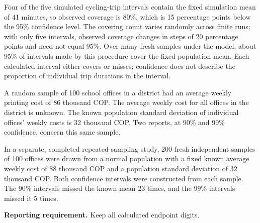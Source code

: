 Four of the five simulated cycling-trip intervals contain the fixed simulation mean of 41 minutes, so observed coverage is 80\%, which is 15 percentage points below the 95\% confidence level. The covering count varies randomly across finite runs; with only five intervals, observed coverage changes in steps of 20 percentage points and need not equal 95\%. Over many fresh samples under the model, about 95\% of intervals made by this procedure cover the fixed population mean. Each calculated interval either covers or misses; confidence does not describe the proportion of individual trip durations in the interval.

\vspace{-3mm}
\vspace{-4mm}
A random sample of 100 school offices in a district had an average weekly printing cost of 86 thousand COP. The average weekly cost for all offices in the district is unknown. The known population standard deviation of individual offices' weekly costs is 32 thousand COP. Two reports, at 90\% and 99\% confidence, concern this same sample.

In a separate, completed repeated-sampling study, 200 fresh independent samples of 100 offices were drawn from a normal population with a fixed known average weekly cost of 88 thousand COP and a population standard deviation of 32 thousand COP. Both confidence intervals were constructed from each sample. The 90\% intervals missed the known mean 23 times, and the 99\% intervals missed it 5 times.

\textbf{Reporting requirement.} Keep all calculated endpoint digits.


